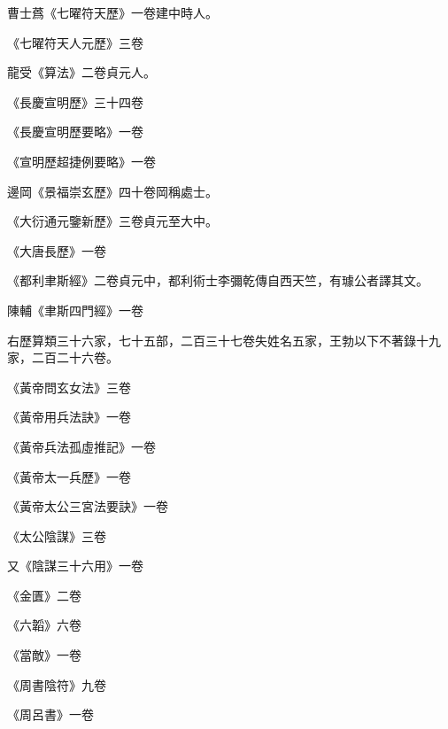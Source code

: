 \begin{pinyinscope}
 曹士蔿《七曜符天歷》一卷建中時人。



 《七曜符天人元歷》三卷



 龍受《算法》二卷貞元人。



 《長慶宣明歷》三十四卷



 《長慶宣明歷要略》一卷



 《宣明歷超捷例要略》一卷



 邊岡《景福崇玄歷》四十卷岡稱處士。



 《大衍通元鑒新歷》三卷貞元至大中。



 《大唐長歷》一卷



 《都利聿斯經》二卷貞元中，都利術士李彌乾傳自西天竺，有璩公者譯其文。



 陳輔《聿斯四門經》一卷



 右歷算類三十六家，七十五部，二百三十七卷失姓名五家，王勃以下不著錄十九家，二百二十六卷。



 《黃帝問玄女法》三卷



 《黃帝用兵法訣》一卷



 《黃帝兵法孤虛推記》一卷



 《黃帝太一兵歷》一卷



 《黃帝太公三宮法要訣》一卷



 《太公陰謀》三卷



 又《陰謀三十六用》一卷



 《金匱》二卷



 《六韜》六卷



 《當敵》一卷



 《周書陰符》九卷



 《周呂書》一卷




\end{pinyinscope}
